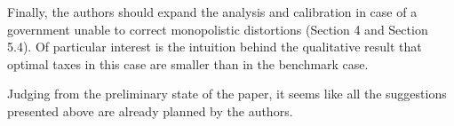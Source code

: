 \documentclass[american]{scrartcl}
\begin{document}
Finally, the authors should expand the analysis and calibration in case of a government unable to correct monopolistic distortions (Section 4 and Section 5.4). Of particular interest is the intuition behind the qualitative result that optimal taxes in this case are smaller than in the benchmark case.

Judging from the preliminary state of the paper, it seems like all the suggestions presented above are already planned by the authors.

\newpage
\nocite{*}
\printbibliography
\end{document}
